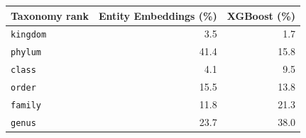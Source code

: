 \begin{tabular}{lrr}
\toprule
Taxonomy rank & Entity Embeddings (\%) & XGBoost (\%) \\
\midrule
\texttt{kingdom} & 3.5 & 1.7 \\
\texttt{phylum} & 41.4 & 15.8 \\
\texttt{class} & 4.1 & 9.5 \\
\texttt{order} & 15.5 & 13.8 \\
\texttt{family} & 11.8 & 21.3 \\
\texttt{genus} & 23.7 & 38.0 \\
\bottomrule
\end{tabular}
